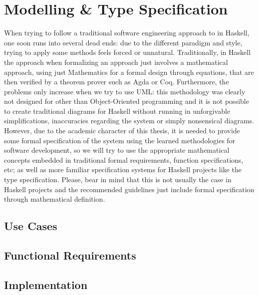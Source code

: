 \section{Modelling \& Type Specification}

When trying to follow a traditional software engineering approach to in
Haskell, one soon runs into several dead ends: due to the different paradigm
and style, trying to apply some methods feels forced or unnatural.
Traditionally, in Haskell the approach when formalizing an approach just
involves a mathematical approach, using just Mathematics for a formal design
through equations, that are then verified by a theorem prover such as Agda or
Coq. Furthermore, the problems only increase when we try to use UML: this
methodology was clearly not designed for other than Object-Oriented programming
and it is not possible to create traditional diagrams for Haskell without
running in unforgivable simplifications, inaccuracies regarding the system or
simply nonsensical diagrams. \\

However, due to the academic character of this thesis, it is needed to provide
some formal specification of the system using the learned methodologies for
software development, so we will try to use the appropriate mathematical
concepts embedded in traditional formal requirements, function specifications,
etc; as well as more familiar specification systems for Haskell projects like
the type specification. Please, bear in mind that this is not usually the case
in Haskell projects and the recommended guidelines just include formal
specification through mathematical definition. \\

\subsection{Use Cases}
\subsection{Functional Requirements}
\subsection{Implementation}

\newpage
